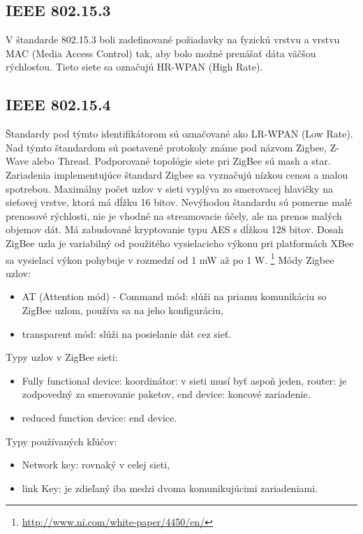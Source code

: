 \documentclass[12pt,a4paper,oneside,openright]{report}
\begin{document}
\subsection{IEEE 802.15.3}
V štandarde 802.15.3 boli zadefinované požiadavky na fyzickú vrstvu a vrstvu MAC (Media Access Control) tak, aby bolo možné prenášať dáta väčšou rýchlosťou. Tieto siete sa označujú HR-WPAN (High Rate).

\subsection{IEEE 802.15.4}
Štandardy pod týmto identifikátorom sú označované ako LR-WPAN (Low Rate). Nad týmto štandardom sú postavené protokoly známe pod názvom Zigbee, Z-Wave alebo Thread.
Podporované topológie siete pri ZigBee sú mash a star. Zariadenia implementujúce štandard Zigbee sa vyznačujú nízkou cenou a malou spotrebou. Maximálny počet uzlov v sieti vyplýva zo smerovacej hlavičky na sieťovej vrstve, ktorá má dĺžku 16 bitov. Nevýhodou štandardu sú pomerne malé prenosové rýchlosti, nie je vhodné na streamovacie účely, ale na prenos malých objemov dát. Má zabudované kryptovanie typu AES s dĺžkou 128 bitov. Dosah ZigBee uzla je variabilný od použitého vysielacieho výkonu pri platformách XBee sa vysielací výkon pohybuje v rozmedzí od 1 mW až po 1 W.
\footnote{\url{http://www.ni.com/white-paper/4450/en/}}
Módy Zigbee uzlov:
\begin{itemize}
	\item AT (Attention mód) - Command mód: slúži na priamu komunikáciu so ZigBee uzlom, používa sa na jeho konfiguráciu,
	\item transparent mód: slúži na posielanie dát cez sieť.
\end{itemize}
\onehalfspacing

Typy uzlov v ZigBee sieti:
\singlespacing
\begin{itemize}
	\item Fully functional device:
		\subitem koordinátor: v sieti musí byť aspoň jeden,
		\subitem router: je zodpovedný za smerovanie paketov,
		\subitem end device: koncové zariadenie.
	\item reduced function device:
		\subitem end device.
\end{itemize}
\onehalfspacing

Typy používaných kľúčov:
\singlespacing
\begin{itemize}
	\item Network key: rovnaký v celej sieti,
	\item link Key: je zdieľaný iba medzi dvoma komunikujúcimi zariadeniami.
\end{itemize}
\onehalfspacing
\end{document}
